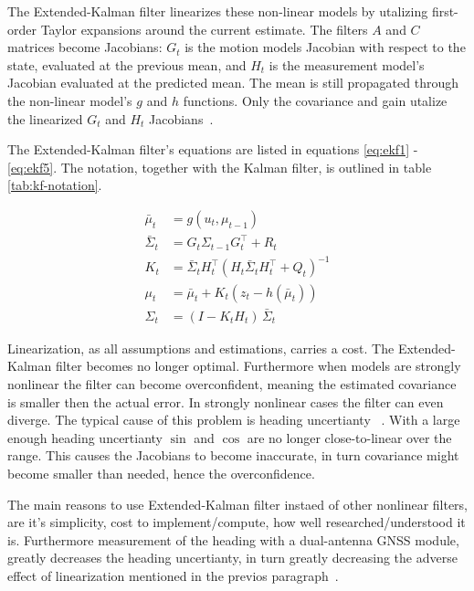 The Extended-Kalman filter linearizes these non-linear models by utalizing
first-order Taylor expansions around the current estimate.
The filters $A$ and $C$ matrices become Jacobians: $G_t$ is the motion models
Jacobian with respect to the state, evaluated at the previous mean, and $H_t$
is the measurement model's Jacobian evaluated at the predicted mean.
The mean is still propagated through the non-linear model's $g$ and $h$ functions.
Only the covariance and gain utalize the linearized
$G_t$ and $H_t$ Jacobians~\citep[ch.~3]{thrun2005probabilistic}.

The Extended-Kalman filter's equations are listed in equations \ref{eq:ekf1} - \ref{eq:ekf5}.
The notation, together with the Kalman filter, is outlined in table \ref{tab:kf-notation}.

\begin{align}
  \label{eq:ekf1}
  \bar{\mu}_t &= g(u_t, \mu_{t-1}) \\
  \bar{\Sigma}_t &= G_t \Sigma_{t-1} G_t^\top + R_t \\
  K_t &= \bar{\Sigma}_t H_t^\top \left( H_t \bar{\Sigma}_t H_t^\top + Q_t \right)^{-1} \\
  \mu_t &= \bar{\mu}_t + K_t \left( z_t - h(\bar{\mu}_t) \right) \\
  \Sigma_t &= (I - K_t H_t)\, \bar{\Sigma}_t \label{eq:ekf5}
\end{align}

Linearization, as all assumptions and estimations, carries a cost.
The Extended-Kalman filter becomes no longer optimal.
Furthermore when models are strongly nonlinear the filter can become overconfident,
meaning the estimated covariance is smaller then the actual error.
In strongly nonlinear cases the filter can even diverge.
The typical cause of this problem is heading uncertianty
~\citep{bailey2006consistency, huang2007convergence}.
With a large enough heading uncertianty $\sin$ and $\cos$
are no longer close-to-linear over the range.
This causes the Jacobians to become inaccurate,
in turn covariance might become smaller than needed, hence the overconfidence.

The main reasons to use Extended-Kalman filter instaed of other nonlinear filters,
are it's simplicity, cost to implement/compute, how well researched/understood it is.
Furthermore measurement of the heading with a dual-antenna GNSS module, greatly decreases
the heading uncertianty, in turn greatly decreasing the adverse effect of linearization mentioned
in the previos paragraph~\citep{TODO}.


